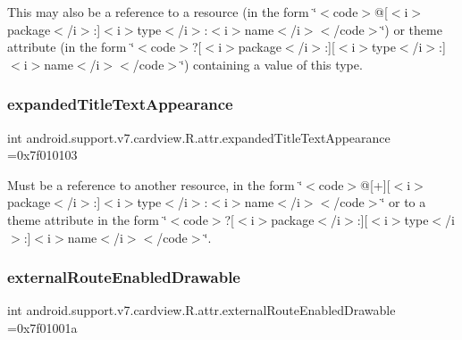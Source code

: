 This may also be a reference to a resource (in the form \char`\"{}$<$code$>$@\mbox{[}$<$i$>$package$<$/i$>$\+:\mbox{]}$<$i$>$type$<$/i$>$\+:$<$i$>$name$<$/i$>$$<$/code$>$\char`\"{}) or theme attribute (in the form \char`\"{}$<$code$>$?\mbox{[}$<$i$>$package$<$/i$>$\+:\mbox{]}\mbox{[}$<$i$>$type$<$/i$>$\+:\mbox{]}$<$i$>$name$<$/i$>$$<$/code$>$\char`\"{}) containing a value of this type. \mbox{\label{classandroid_1_1support_1_1v7_1_1cardview_1_1R_1_1attr_a584d2e618ca9dda1b87ba8c0f9a707ba}} 
\subsubsection{\texorpdfstring{expanded\+Title\+Text\+Appearance}{expandedTitleTextAppearance}}
{\footnotesize\ttfamily int android.\+support.\+v7.\+cardview.\+R.\+attr.\+expanded\+Title\+Text\+Appearance =0x7f010103\hspace{0.3cm}{\ttfamily [static]}}

Must be a reference to another resource, in the form \char`\"{}$<$code$>$@\mbox{[}+\mbox{]}\mbox{[}$<$i$>$package$<$/i$>$\+:\mbox{]}$<$i$>$type$<$/i$>$\+:$<$i$>$name$<$/i$>$$<$/code$>$\char`\"{} or to a theme attribute in the form \char`\"{}$<$code$>$?\mbox{[}$<$i$>$package$<$/i$>$\+:\mbox{]}\mbox{[}$<$i$>$type$<$/i$>$\+:\mbox{]}$<$i$>$name$<$/i$>$$<$/code$>$\char`\"{}. \mbox{\label{classandroid_1_1support_1_1v7_1_1cardview_1_1R_1_1attr_aedee62fbf24091473b5ad19638db6930}} 
\subsubsection{\texorpdfstring{external\+Route\+Enabled\+Drawable}{externalRouteEnabledDrawable}}
{\footnotesize\ttfamily int android.\+support.\+v7.\+cardview.\+R.\+attr.\+external\+Route\+Enabled\+Drawable =0x7f01001a\hspace{0.3cm}{\ttfamily [static]}}

